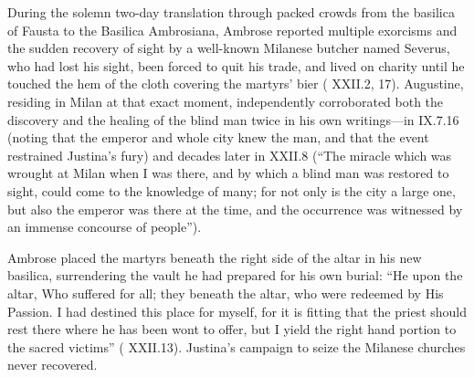 During the solemn two-day translation through packed crowds from the basilica of Fausta to the Basilica Ambrosiana, Ambrose reported multiple exorcisms and the sudden recovery of sight by a well-known Milanese butcher named Severus, who had lost his sight, been forced to quit his trade, and lived on charity until he touched the hem of the cloth covering the martyrs' bier ( XXII.2, 17). Augustine, residing in Milan at that exact moment, independently corroborated both the discovery and the healing of the blind man twice in his own writings---in  IX.7.16 (noting that the emperor and whole city knew the man, and that the event restrained Justina's fury) and decades later in  XXII.8 (``The miracle which was wrought at Milan when I was there, and by which a blind man was restored to sight, could come to the knowledge of many; for not only is the city a large one, but also the emperor was there at the time, and the occurrence was witnessed by an immense concourse of people'').


Ambrose placed the martyrs beneath the right side of the altar in his new basilica, surrendering the vault he had prepared for his own burial: ``He upon the altar, Who suffered for all; they beneath the altar, who were redeemed by His Passion. I had destined this place for myself, for it is fitting that the priest should rest there where he has been wont to offer, but I yield the right hand portion to the sacred victims'' ( XXII.13). Justina's campaign to seize the Milanese churches never recovered.
